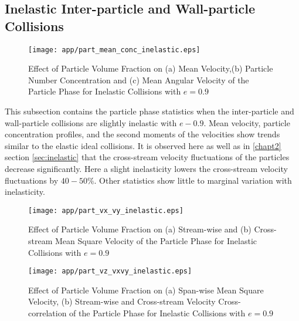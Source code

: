 \subsection{Inelastic Inter-particle and Wall-particle Collisions}
\label{sec:Particle Phase Statistics inelastic}
\begin{figure}[!h]
			\texttt{[image: app/part\_mean\_conc\_inelastic.eps]}
			\caption{Effect of Particle Volume Fraction on (a) Mean Velocity,(b) Particle Number Concentration and (c) Mean Angular Velocity of the Particle Phase for Inelastic Collisions with $e=0.9$} 
			\label{fig:particle_phase_stat_1_inelastic}
		\end{figure}
This subsection contains the particle phase statistics when the inter-particle and wall-particle collisions are slightly inelastic with $e-0.9$. Mean velocity, particle concentration profiles, and the second moments of the velocities show trends similar to the elastic ideal collisions. It is observed here as well as in \ref{chapt2} section \ref{sec:inelastic} that the cross-stream velocity fluctuations of the particles decrease significantly. Here a slight inelasticity lowers the cross-stream velocity fluctuations by $40-50\%$. Other statistics show little to marginal variation with inelasticity. 		
		\begin{figure}[!h]
			\texttt{[image: app/part\_vx\_vy\_inelastic.eps]}
			\caption{Effect of Particle Volume Fraction on (a) Stream-wise and (b) Cross-stream Mean Square Velocity of the Particle Phase for Inelastic Collisions with $e=0.9$}
			\label{fig:particle_phase_stat_2_inelastic}
		\end{figure} 
		\begin{figure}[!h]
			\texttt{[image: app/part\_vz\_vxvy\_inelastic.eps]}
			\caption{Effect of Particle Volume Fraction on (a) Span-wise Mean Square Velocity, (b) Stream-wise and Cross-stream Velocity Cross-correlation of the Particle Phase for Inelastic Collisions with $e=0.9$} 
			\label{fig:particle_phase_stat_3_inelastic}
		\end{figure}


\clearpage
